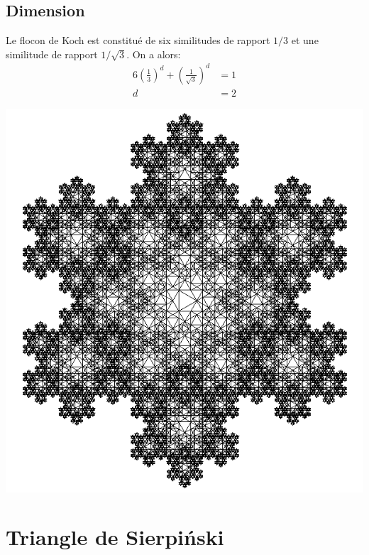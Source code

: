 \documentclass[a4paper, 12pt]{report}
\begin{document}
			\subsection{Dimension}
				Le flocon de Koch est constitué de six similitudes de rapport $1/3$ et une similitude de rapport $1/\sqrt{3}$. On a alors:
				\begin{align*}
					 6\left(\frac{1}{3}\right)^d+\left(\frac{1}{\sqrt{3}}\right)^d	&=1\\
																				d	&=2
				\end{align*}
				\begin{center}
					\includegraphics[scale=0.4]{Images/flocon}
				\end{center}
		\newpage
		\section{Triangle de Sierpiński}
\end{document}
